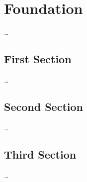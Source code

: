 \chapter{Foundation}
\label{ch:Foundation}

\dots

\section{First Section}
\label{sec:Foundation:FirstSection}

\dots

\section{Second Section}
\label{sec:Foundation:SecondSection}

\dots

\section{Third Section}
\label{sec:Foundation:ThirdSection}

\dots
